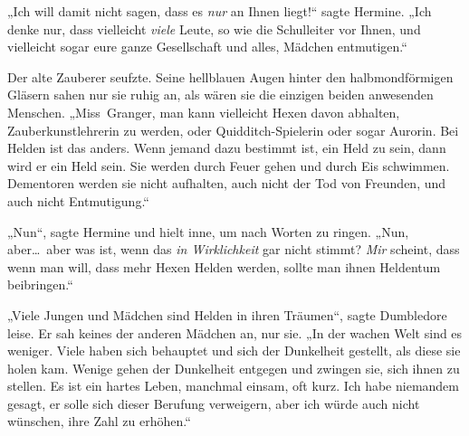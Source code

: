 „Ich will damit nicht sagen, dass es \emph{nur} an Ihnen liegt!“ sagte Hermine. „Ich denke nur, dass vielleicht \emph{viele} Leute, so wie die Schulleiter vor Ihnen, und vielleicht sogar eure ganze Gesellschaft und alles, Mädchen entmutigen.“

Der alte Zauberer seufzte. Seine hellblauen Augen hinter den halbmondförmigen Gläsern sahen nur sie ruhig an, als wären sie die einzigen beiden anwesenden Menschen. „Miss~Granger, man kann vielleicht Hexen davon abhalten, Zauberkunstlehrerin zu werden, oder Quidditch-Spielerin oder sogar Aurorin. Bei Helden ist das anders. Wenn jemand dazu bestimmt ist, ein Held zu sein, dann wird er ein Held sein. Sie werden durch Feuer gehen und durch Eis schwimmen. Dementoren werden sie nicht aufhalten, auch nicht der Tod von Freunden, und auch nicht Entmutigung.“

„Nun“, sagte Hermine und hielt inne, um nach Worten zu ringen. „Nun, aber…~aber was ist, wenn das \emph{in Wirklichkeit} gar nicht stimmt? \emph{Mir} scheint, dass wenn man will, dass mehr Hexen Helden werden, sollte man ihnen Heldentum beibringen.“

„Viele Jungen und Mädchen sind Helden in ihren Träumen“, sagte Dumbledore leise. Er sah keines der anderen Mädchen an, nur sie. „In der wachen Welt sind es weniger. Viele haben sich behauptet und sich der Dunkelheit gestellt, als diese sie holen kam. Wenige gehen der Dunkelheit entgegen und zwingen sie, sich ihnen zu stellen. Es ist ein hartes Leben, manchmal einsam, oft kurz. Ich habe niemandem gesagt, er solle sich dieser Berufung verweigern, aber ich würde auch nicht wünschen, ihre Zahl zu erhöhen.“

